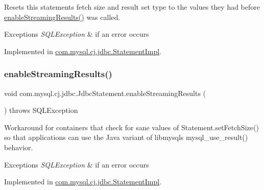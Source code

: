 Resets this statements fetch size and result set type to the values they had before \mbox{\hyperlink{interfacecom_1_1mysql_1_1cj_1_1jdbc_1_1_jdbc_statement_a35049f45e6278dc1b824812acbe75556}{enable\+Streaming\+Results()}} was called.


\begin{DoxyExceptions}{Exceptions}
{\em S\+Q\+L\+Exception} & if an error occurs \\
\hline
\end{DoxyExceptions}


Implemented in \mbox{\hyperlink{classcom_1_1mysql_1_1cj_1_1jdbc_1_1_statement_impl_a9e5713d601e7e410e0edb1647b6f9160}{com.\+mysql.\+cj.\+jdbc.\+Statement\+Impl}}.

\mbox{\label{interfacecom_1_1mysql_1_1cj_1_1jdbc_1_1_jdbc_statement_a35049f45e6278dc1b824812acbe75556}} 
\subsubsection{\texorpdfstring{enable\+Streaming\+Results()}{enableStreamingResults()}}
{\footnotesize\ttfamily void com.\+mysql.\+cj.\+jdbc.\+Jdbc\+Statement.\+enable\+Streaming\+Results (\begin{DoxyParamCaption}{ }\end{DoxyParamCaption}) throws S\+Q\+L\+Exception}

Workaround for containers that \textquotesingle{}check\textquotesingle{} for sane values of Statement.\+set\+Fetch\+Size() so that applications can use the Java variant of libmysql\textquotesingle{}s mysql\+\_\+use\+\_\+result() behavior.


\begin{DoxyExceptions}{Exceptions}
{\em S\+Q\+L\+Exception} & if an error occurs \\
\hline
\end{DoxyExceptions}


Implemented in \mbox{\hyperlink{classcom_1_1mysql_1_1cj_1_1jdbc_1_1_statement_impl_a973ff5045e258a5c3e156887c116c976}{com.\+mysql.\+cj.\+jdbc.\+Statement\+Impl}}.

\mbox{\label{interfacecom_1_1mysql_1_1cj_1_1jdbc_1_1_jdbc_statement_a1f5ddb4f3f7ad5c677a27d5350568eac}} 

